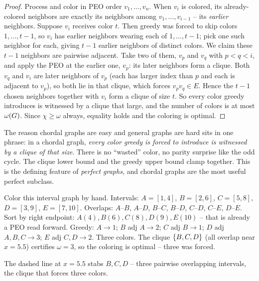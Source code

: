 \begin{proof}
Process and color in PEO order $v_1,\dots,v_n$. When $v_i$ is colored, its
already-colored neighbors are exactly its neighbors among $v_1,\dots,v_{i-1}$ --
its \emph{earlier} neighbors. Suppose $v_i$ receives color $t$. Then greedy was
forced to skip colors $1,\dots,t-1$, so $v_i$ has earlier neighbors wearing each of
$1,\dots,t-1$; pick one such neighbor for each, giving $t-1$ earlier neighbors of
distinct colors. We claim these $t-1$ neighbors are pairwise adjacent. Take
two of them, $v_p$ and $v_q$ with $p<q<i$, and apply the PEO at the earlier one,
$v_p$: its later neighbors form a clique. Both $v_q$ and $v_i$ are later neighbors
of $v_p$ (each has larger index than $p$ and each is adjacent to $v_p$), so both lie
in that clique, which forces $v_p v_q\in E$. Hence the $t-1$ chosen neighbors
together with $v_i$ form a clique of
size $t$. So every color greedy introduces is witnessed by a clique that large, and
the number of colors is at most $\omega(G)$. Since $\chi\ge\omega$ always,
equality holds and the coloring is optimal.
\end{proof}

\begin{whybox}
The reason chordal graphs are easy and general graphs are hard sits in one phrase:
in a chordal graph, \emph{every color greedy is forced to introduce is witnessed by
a clique of that size}. There is no ``wasted'' color, no parity surprise like the
odd cycle. The clique lower bound and the greedy upper bound clamp together. This is
the defining feature of \emph{perfect graphs}, and chordal graphs are the most
useful perfect subclass.
\end{whybox}

\begin{labbox}
Color this interval graph by hand. Intervals: $A=[1,4]$, $B=[2,6]$, $C=[5,8]$,
$D=[3,9]$, $E=[7,10]$. Overlaps: $A$--$B$, $A$--$D$, $B$--$C$, $B$--$D$, $C$--$D$,
$C$--$E$, $D$--$E$. Sort by right endpoint: $A(4),B(6),C(8),D(9),E(10)$ -- that is
already a PEO read forward. Greedy: $A\to1$; $B$ adj $A\to2$; $C$ adj $B\to1$; $D$
adj $A,B,C\to3$; $E$ adj $C,D\to2$. Three colors. The clique
$\{B,C,D\}$ (all overlap near $x=5.5$) certifies $\omega=3$, so the coloring is
optimal -- three was forced.
\begin{center}
\end{center}
The dashed line at $x=5.5$ stabs $B,C,D$ -- three pairwise overlapping intervals,
the clique that forces three colors.
\end{labbox}


